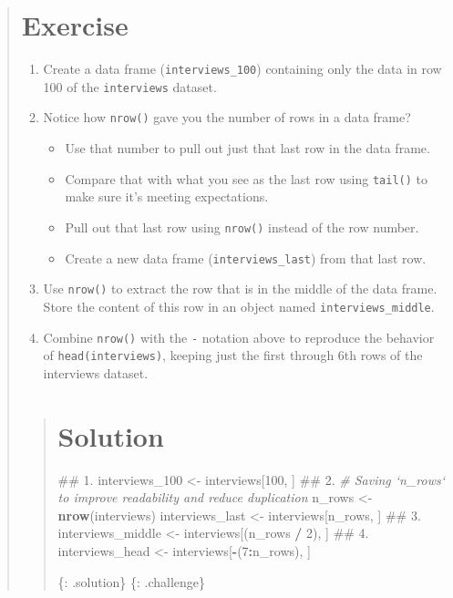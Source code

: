 \documentclass[]{book}
\newenvironment{Shaded}{\begin{snugshade}}{\end{snugshade}}
\newcommand{\KeywordTok}[1]{\textcolor[rgb]{0.13,0.29,0.53}{\textbf{#1}}}
\newcommand{\DecValTok}[1]{\textcolor[rgb]{0.00,0.00,0.81}{#1}}
\newcommand{\StringTok}[1]{\textcolor[rgb]{0.31,0.60,0.02}{#1}}
\newcommand{\CommentTok}[1]{\textcolor[rgb]{0.56,0.35,0.01}{\textit{#1}}}
\newcommand{\OperatorTok}[1]{\textcolor[rgb]{0.81,0.36,0.00}{\textbf{#1}}}
\newcommand{\NormalTok}[1]{#1}
\providecommand{\tightlist}{%
  \setlength{\itemsep}{0pt}\setlength{\parskip}{0pt}}
\begin{document}
\begin{quote}
\section{Exercise}\label{exercise-6}

\begin{enumerate}
\def\labelenumi{\arabic{enumi}.}
\item
  Create a data frame (\texttt{interviews\_100}) containing only the
  data in row 100 of the \texttt{interviews} dataset.
\item
  Notice how \texttt{nrow()} gave you the number of rows in a data
  frame?

  \begin{itemize}
  \tightlist
  \item
    Use that number to pull out just that last row in the data frame.
  \item
    Compare that with what you see as the last row using \texttt{tail()}
    to make sure it's meeting expectations.
  \item
    Pull out that last row using \texttt{nrow()} instead of the row
    number.
  \item
    Create a new data frame (\texttt{interviews\_last}) from that last
    row.
  \end{itemize}
\item
  Use \texttt{nrow()} to extract the row that is in the middle of the
  data frame. Store the content of this row in an object named
  \texttt{interviews\_middle}.
\item
  Combine \texttt{nrow()} with the \texttt{-} notation above to
  reproduce the behavior of \texttt{head(interviews)}, keeping just the
  first through 6th rows of the interviews dataset.
\end{enumerate}

\begin{quote}
\section{Solution}\label{solution-7}

\begin{Shaded}
\begin{Highlighting}[]
\NormalTok{## 1.}
\NormalTok{interviews_}\DecValTok{100}\NormalTok{ <-}\StringTok{ }\NormalTok{interviews[}\DecValTok{100}\NormalTok{, ]}
\NormalTok{## 2.}
\CommentTok{# Saving `n_rows` to improve readability and reduce duplication}
\NormalTok{n_rows <-}\StringTok{ }\KeywordTok{nrow}\NormalTok{(interviews)}
\NormalTok{interviews_last <-}\StringTok{ }\NormalTok{interviews[n_rows, ]}
\NormalTok{## 3.}
\NormalTok{interviews_middle <-}\StringTok{ }\NormalTok{interviews[(n_rows }\OperatorTok{/}\StringTok{ }\DecValTok{2}\NormalTok{), ]}
\NormalTok{## 4.}
\NormalTok{interviews_head <-}\StringTok{ }\NormalTok{interviews[}\OperatorTok{-}\NormalTok{(}\DecValTok{7}\OperatorTok{:}\NormalTok{n_rows), ]}
\end{Highlighting}
\end{Shaded}

\{: .solution\} \{: .challenge\}
\end{quote}
\end{quote}
\end{document}
